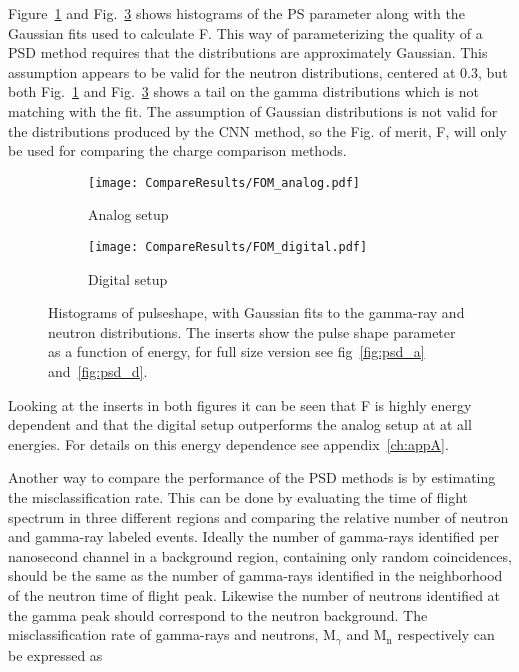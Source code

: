 \documentclass[main.tex]{subfiles}
\begin{document}
Figure~\ref{fig:fom_analog} and Fig.~\ref{fig:fom_digital} shows histograms of the PS parameter along with the Gaussian fits used to calculate F. This way of parameterizing the quality of a PSD method requires that the distributions are approximately Gaussian. This assumption appears to be valid for the neutron distributions, centered at 0.3, but both Fig.~\ref{fig:fom_analog} and Fig.~\ref{fig:fom_digital} shows a tail on the gamma distributions which is not matching with the fit. The assumption of Gaussian distributions is not valid for the distributions produced by the CNN method, so the Fig. of merit, F, will only be used for comparing the charge comparison methods. 

\begin{figure}[h!]
	\begin{subfigure}[b]{\textwidth}
	    \centering
    	    \texttt{[image: CompareResults/FOM\_analog.pdf]}
        	\caption{Analog setup}
	    \label{fig:fom_analog} 
	\end{subfigure}
	\begin{subfigure}[b]{\textwidth}
    	\centering
        	\texttt{[image: CompareResults/FOM\_digital.pdf]}
        	\caption{Digital setup}
    	\label{fig:fom_digital} 
    \end{subfigure}
    \caption[Histograms of pulseshape, with Gaussian fits.]{Histograms of pulseshape, with Gaussian fits to the gamma-ray and neutron distributions. The inserts show the pulse shape parameter as a function of energy, for full size version see fig~\ref{fig:psd_a} and~\ref{fig:psd_d}. }
\end{figure}

Looking at the inserts in both figures it can be seen that F is highly energy dependent and that the digital setup outperforms the analog setup at at all energies. For details on this energy dependence see appendix~\ref{ch:appA}. 

Another way to compare the performance of the PSD methods is by estimating the misclassification rate. This can be done by evaluating the time of flight spectrum in three different regions and comparing the relative number of neutron and gamma-ray labeled events. Ideally the number of gamma-rays identified per nanosecond channel in a background region, containing only random coincidences, should be the same as the number of gamma-rays identified in the neighborhood of the neutron time of flight peak. Likewise the number of neutrons identified at the gamma peak should correspond to the neutron background. The misclassification rate of gamma-rays and neutrons, 
M$_{\gamma}$ and M$_\textrm{n}$ respectively can be expressed as
\end{document}
